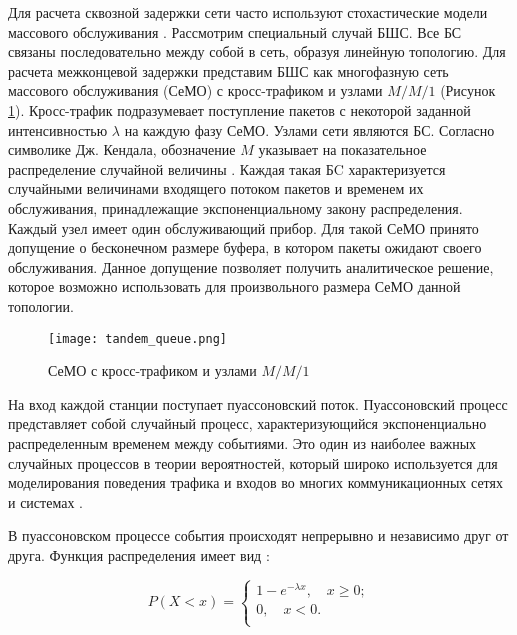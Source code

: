 Для расчета сквозной задержки сети часто используют стохастические модели массового обслуживания \cite{Vishnevsky2016_Methods_of_performance, Wang2017, Liu2016, Malandra2018, Larionov2019, Gao2016}. Рассмотрим специальный случай БШС. Все БС связаны последовательно между собой в сеть, образуя линейную топологию. Для расчета межконцевой задержки представим БШС как многофазную сеть массового обслуживания (СеМО) с кросс-трафиком и узлами $M/M/1$ (Рисунок \cref{fig:tandem_queue}). Кросс-трафик подразумевает поступление пакетов с некоторой заданной интенсивностью $\lambda$ на каждую фазу СеМО. Узлами сети являются БС. Согласно символике Дж. Кендала, обозначение $M$ указывает на показательное распределение случайной величины \cite{VishnevskyBook, Kleinrock1975}. Каждая такая БC характеризуется случайными величинами входящего потоком пакетов и временем их обслуживания, принадлежащие экспоненциальному закону распределения. Каждый узел имеет один обслуживающий прибор. Для такой СеМО принято допущение о бесконечном размере буфера, в котором пакеты ожидают своего обслуживания. Данное допущение позволяет получить аналитическое решение, которое возможно использовать для произвольного размера СеМО данной топологии.

\begin{figure}[h!]
  \centering
   \texttt{[image: tandem\_queue.png]}
\caption{СеМО с кросс-трафиком и узлами $M/M/1$}
\label{fig:tandem_queue}
\end{figure}

На вход каждой станции поступает пуассоновский поток. Пуассоновский процесс представляет собой случайный процесс, характеризующийся  экспоненциально распределенным временем между событиями. Это один из наиболее важных случайных процессов в теории вероятностей, который широко используется для моделирования поведения трафика и входов во многих коммуникационных сетях и системах \cite{Kalor2018, Gao2016, Malandra2018, Seliem2019}. 

В пуассоновском процессе события происходят непрерывно и независимо друг от друга. Функция распределения имеет вид  \cite{VishnevskyBook, Kleinrock1975}:

\begin{displaymath}
P(X<x) = 
  \begin{cases}
    1 - e^{- \lambda x}, \quad x \geqslant 0; \\
    0, \quad x < 0.\\
  \end{cases}
\end{displaymath}

